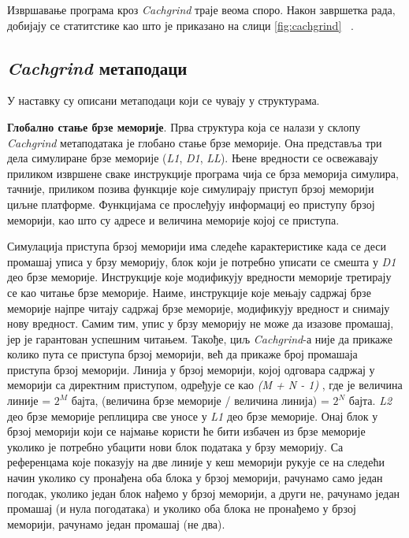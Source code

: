 \documentclass[12pt,oneside]{memoir}
\begin{document}
\indent Извршавање програма кроз \textit{Cachgrind} траје веома споро. Након завршетка рада, добијају се статитстике као што је приказано на слици \ref{fig:cachgrind} ~\cite{cachegrindRef}.

\subsection{\textit{Cachgrind} метаподаци}

\indent У наставку су описани метаподаци који се чувају у структурама.

\indent \textbf{Глобално стање брзе меморије}. Прва структура која се налази у склопу \textit{Cachgrind} метаподатака је глобано стање брзе меморије. Она представља три дела симулиране брзе меморије (\textit{L1}, \textit{D1},  \textit{LL}). Њене вредности се освежавају приликом извршене сваке инструкције програма чија се брза меморија симулира, тачније, приликом позива функције које симулирају приступ брзој меморији циљне платформе. Функцијама се прослеђују информациј ео приступу брзој меморији, као што су адресе и величина меморије којој се приступа.

\indent Симулација приступа брзој меморији има следеће карактеристике када се деси промашај уписа у брзу меморију, блок који је потребно уписати се смешта у \textit{D1} део брзе меморије. Инструкције које модификују вредности меморије третирају се као читање брзе меморије. Наиме, инструкције које мењају садржај брзе меморије најпре читају садржај брзе меморије, модификују вредност и снимају нову вредност. Самим тим, упис у брзу меморију не може да изазове промашај, јер је гарантован успешним читањем. Такође, циљ \textit{Cachgrind}-а није да прикаже колико пута се приступа брзој меморији, већ да прикаже број промашаја приступа брзој меморији. Линија у брзој меморији, којој одговара садржај у меморији са директним приступом, одређује се као \textit{ (M + N - 1) }, где је величина линије = $2^M$ бајта, (величина брзе меморије / величина линија) = $2^N$ бајта. \textit{L2} део брзе меморије реплицира све уносе у \textit{L1} део брзе меморије. Онај блок у брзој меморији који се најмање користи ће бити избачен из брзе меморије уколико је потребно убацити нови блок података у брзу меморију. Са референцама које показују на две линије у кеш меморији рукује се на следећи начин уколико су пронађена оба блока у брзој меморији, рачунамо само један погодак, уколико један блок нађемо у брзој меморији, а други не, рачунамо један промашај (и нула погодатака) и уколико оба блока не пронађемо у брзој меморији, рачунамо један промашај (не два).
\end{document}
